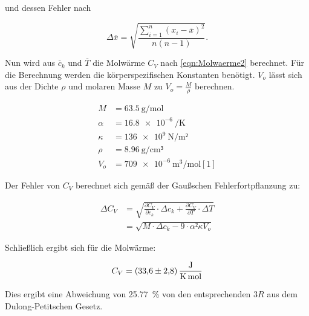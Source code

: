 und dessen Fehler nach 

\begin{equation*}
\Delta \overline x = \sqrt{\frac{\sum^{n}_{i=1}(x_i - \overline x)^2}{n(n-1)}}. 
\end{equation*}

Nun wird aus $\overline c_k$ und $\overline T$ die Molwärme $C_V$ nach 
\ref{eqn:Molwaerme2} berechnet. Für die Berechnung werden die 
körperspezifischen Konstanten benötigt. $V_o$ lässt sich aus der Dichte 
$\rho$ und molaren Masse $M$ zu $V_o = \frac{M}{\rho}$ berechnen.

\begin{align*}
M &= \SI{63.5}{\gram\per\mol}\\
\alpha &= \SI{16.8e-6}{\per\kelvin}\\
\kappa &= \SI{136e9}{\newton\per\m²}\\
\rho &= \SI{8.96}{\gram\per\centi\meter³}\\
V_o &= \SI{709e-6}{\cubic\meter\per\mol} [1]
\end{align*}

Der Fehler von $C_V$ berechnet sich gemäß der Gaußschen Fehlerfortpflanzung
zu:

\begin{align*}
\Delta C_V &= \sqrt{\frac{\partial C_V}{\partial c_k}\cdot\Delta c_k + \frac{\partial C_V}{\partial T}\cdot\Delta T}\\
&= \sqrt{M\cdot\Delta c_k - 9\cdot\alpha²\kappa V_o}
\end{align*}

Schließlich ergibt sich für die Molwärme: 

\begin{equation*}
C_V = \SI{33.6+-2.8}{\joule\per\kelvin\per\mol}
\end{equation*}

Dies ergibt eine Abweichung von \SI{25.77}{\percent} von den entsprechenden $3R$ aus 
dem Dulong-Petitschen Gesetz. 


